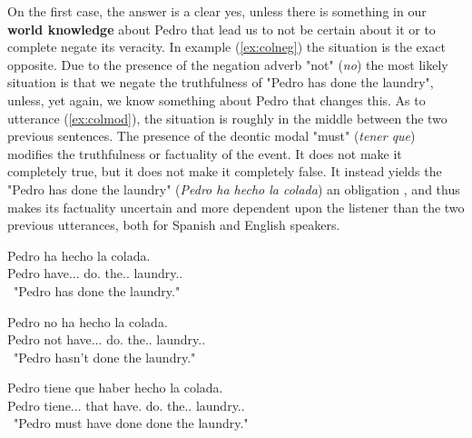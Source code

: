On the first case, the answer is a clear yes, unless there is something in our \textbf{world knowledge} about Pedro that lead us to not be certain about it or to complete negate its veracity. In example (\ref{ex:colneg}) the situation is the exact opposite. Due to the presence of the negation adverb "not" (\textit{no}) the most likely situation is that we negate the truthfulness of "Pedro has done the laundry", unless, yet again, we know something about Pedro that changes this. As to utterance (\ref{ex:colmod}), the situation is roughly in the middle between the two previous sentences. The presence of the deontic modal "must" (\textit{tener que}) modifies the truthfulness or factuality of the event. It does not make it completely true, but it does not make it completely false. It instead yields the "Pedro has done the laundry" (\textit{Pedro ha hecho la colada}) an obligation \citep{morante2012modality}, and thus makes its factuality uncertain and more dependent upon the listener than the two previous utterances, both for Spanish and English speakers.\\

\begin{exe}
  \ex
    \begin{xlist}
      \item  {\gll Pedro ha hecho la colada.\\ Pedro have.\Prs.\Ind.\Tsg{} do.\Ptcp{} the.\F.\Sg{} laundry.\M.\Sg{}\\\ "Pedro has done the laundry."\glt }\label{ex:colpos}
      \item  {\gll Pedro no ha hecho la colada.\\ Pedro not have.\Prs.\Ind.\Tsg{} do.\Ptcp{} the.\F.\Sg{} laundry.\M.\Sg{}\\\ "Pedro hasn't done the laundry."\glt }\label{ex:colneg}
      \item  {\gll Pedro tiene que haber hecho la colada.\\ Pedro tiene.\Prs.\Ind.\Tsg{} that have.\Inf{} do.\Ptcp{} the.\F.\Sg{} laundry.\M.\Sg{}\\\ "Pedro must have done done the laundry."\glt }\label{ex:colmod}
    \end{xlist}
\end{exe}

